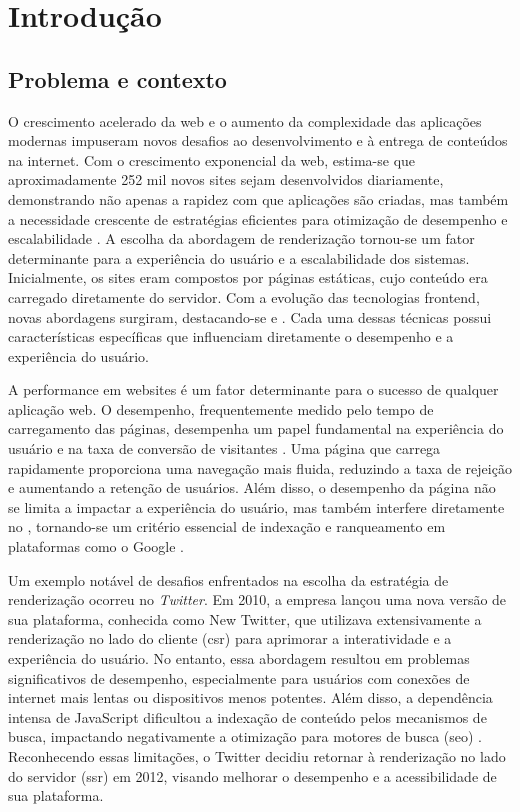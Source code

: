 \chapter{Introdução}
\label{cap:introducao}

\section{Problema e contexto}
O crescimento acelerado da web e o aumento da complexidade das aplicações modernas impuseram novos desafios ao desenvolvimento e à entrega de conteúdos na internet. Com o crescimento exponencial da web, estima-se que aproximadamente 252 mil novos sites sejam desenvolvidos diariamente, demonstrando não apenas a rapidez com que aplicações são criadas, mas também a necessidade crescente de estratégias eficientes para otimização de desempenho e escalabilidade \cite{dataInternetUsage}. A escolha da abordagem de renderização tornou-se um fator determinante para a experiência do usuário e a escalabilidade dos sistemas. Inicialmente, os sites eram compostos por páginas estáticas, cujo conteúdo era carregado diretamente do servidor. Com a evolução das tecnologias frontend, novas abordagens surgiram, destacando-se  e . Cada uma dessas técnicas possui características específicas que influenciam diretamente o desempenho e a experiência do usuário.

A performance em websites é um fator determinante para o sucesso de qualquer aplicação web. O desempenho, frequentemente medido pelo tempo de carregamento das páginas, desempenha um papel fundamental na experiência do usuário e na taxa de conversão de visitantes \cite{webPerformance}. Uma página que carrega rapidamente proporciona uma navegação mais fluida, reduzindo a taxa de rejeição e aumentando a retenção de usuários. Além disso, o desempenho da página não se limita a impactar a experiência do usuário, mas também interfere diretamente no , tornando-se um critério essencial de indexação e ranqueamento em plataformas como o Google \cite{google}.

Um exemplo notável de desafios enfrentados na escolha da estratégia de renderização ocorreu no \emph{Twitter}. Em 2010, a empresa lançou uma nova versão de sua plataforma, conhecida como New Twitter, que utilizava extensivamente a renderização no lado do cliente (\acrshort{csr}) para aprimorar a interatividade e a experiência do usuário. No entanto, essa abordagem resultou em problemas significativos de desempenho, especialmente para usuários com conexões de internet mais lentas ou dispositivos menos potentes. Além disso, a dependência intensa de JavaScript dificultou a indexação de conteúdo pelos mecanismos de busca, impactando negativamente a otimização para motores de busca (\acrshort{seo}) \cite{twitter}. Reconhecendo essas limitações, o Twitter decidiu retornar à renderização no lado do servidor (\acrshort{ssr}) em 2012, visando melhorar o desempenho e a acessibilidade de sua plataforma.

